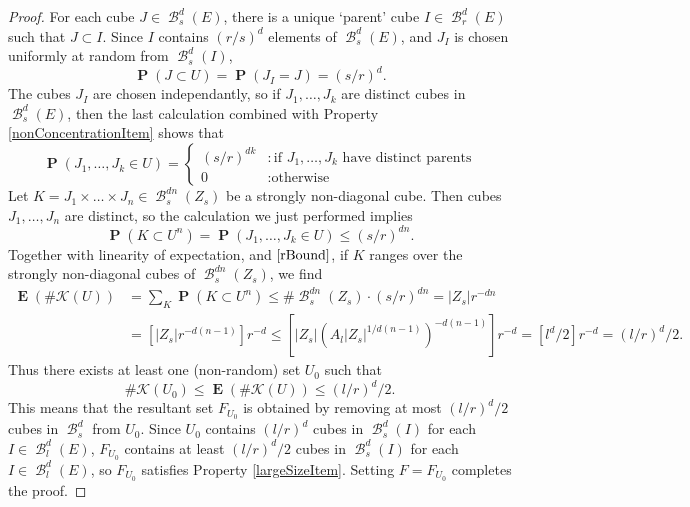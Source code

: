 \documentclass[dvipsnames,letterpaper,12pt]{article}
\numberwithin{equation}{section}
\theoremstyle{plain}
\DeclareMathOperator{\Prob}{\mathbf{P}}
\DeclareMathOperator{\Expect}{\mathbf{E}}
\DeclareMathOperator{\B}{\mathcal{B}}
\begin{document}
\begin{proof}
	For each cube $J \in \B_s^d(E)$, there is a unique `parent' cube $I \in \B_r^d(E)$ such that $J \subset I$. Since $I$ contains $(r/s)^d$ elements of $\B^d_s(E)$, and $J_I$ is chosen uniformly at random from $\B^d_s(I)$,
	\[ \Prob(J \subset U) = \Prob(J_I = J) = (s/r)^d. \]
	The cubes $J_I$ are chosen independantly, so if $J_1, \dots, J_k$ are distinct cubes in $\B^d_s(E)$, then the last calculation combined with Property \ref{nonConcentrationItem} shows that
\[ 		\Prob(J_1, \dots, J_k \in U) = \begin{cases} (s/r)^{dk} &: \text{if $J_1, \dots, J_k$ have distinct parents} \\ 0 &: \text{otherwise} \end{cases} \]
	Let $K = J_1 \times \dots \times J_n \in \B^{dn}_s(Z_s)$ be a strongly non-diagonal cube. Then cubes $J_1, \dots, J_n$ are distinct, so the calculation we just performed implies
	\[	\Prob(K \subset U^n) = \Prob(J_1, \dots, J_k \in U) \leq (s/r)^{dn}. \]
	Together with linearity of expectation, and $\eqref{rBound}$, if $K$ ranges over the strongly non-diagonal cubes of $\B^{dn}_s(Z_s)$, we find
	\begin{align*}
		\Expect(\# \mathcal{K}(U)) &= \sum_K \Prob(K \subset U^n) \leq \# \B_s^{dn}(Z_s) \cdot (s/r)^{dn} = |Z_s| r^{-dn}\\
		&= \left[ |Z_s| r^{-d(n-1)} \right] r^{-d} \leq \left[ |Z_s| (A_l |Z_s|^{1/d(n-1)})^{-d(n-1)} \right] r^{-d} = \left[ l^d/2 \right] r^{-d} = (l/r)^d /2.
	\end{align*}
	Thus there exists at least one (non-random) set $U_0$ such that
	\begin{equation}\label{KU0Small}
		\# \mathcal{K}(U_0) \leq \Expect(\# \mathcal{K}(U)) \leq (l/r)^d/2.
	\end{equation}
	This means that the resultant set $F_{U_0}$ is obtained by removing at most $(l/r)^d/2$ cubes in $\B^d_s$ from $U_0$. Since $U_0$ contains $(l/r)^d$ cubes in $\B^d_s(I)$ for each $I \in \B^d_l(E)$, $F_{U_0}$ contains at least $(l/r)^d/2$ cubes in $\B^d_s(I)$ for each $I \in \B^d_l(E)$, so $F_{U_0}$ satisfies Property \ref{largeSizeItem}. Setting $F = F_{U_0}$ completes the proof.
\end{proof}
\end{document}
